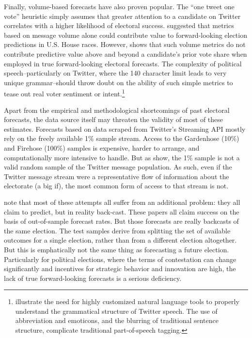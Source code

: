 \documentclass{article}
\begin{document}
Finally, volume-based forecasts have also proven popular. The ``one
tweet one vote'' heuristic simply assumes that greater attention to a
candidate on Twitter correlates with a higher likelihood of electoral
success. \cite{digrazia2013} suggested that metrics based on message
volume alone could contribute value to forward-looking election
predictions in U.S. House races. However, \cite{huberty2013twitter}
shows that such volume metrics do not contribute predictive value above
and beyond a candidate's prior vote share when employed in true
forward-looking electoral forecasts. The complexity of political
speech--particularly on Twitter, where the 140 character limit leads
to very unique grammar--should throw doubt on the ability of such
simple metrics to tease out real voter sentiment or
intent.\footnote{\cite{owoputi2013improved} illustrate the need for
  highly customized natural language tools to properly understand the
  grammatical structure of Twitter speech. The use of abbreviation and
  emoticons, and the blurring of traditional sentence structure,
  complicate traditional part-of-speech tagging.}

Apart from the empirical and methodological shortcomings of past
electoral forecasts, the data source itself may threaten the validity
of most of these estimates. Forecasts based on data scraped from
Twitter's Streaming API mostly rely on the freely available 1\% sample
stream. Access to the Gardenhose (10\%) and Firehose (100\%) samples
is expensive, harder to arrange, and computationally more intensive to
handle. But as \cite{morstatter2013sample} show, the 1\% sample is not
a valid random sample of the Twitter message population. As such, even
if the Twitter message stream were a representative flow of
information about the electorate (a big if), the most common form of
access to that stream is not.

\cite{metaxas2011not} note that most of these attempts all suffer from
an additional problem: they all claim to predict, but in reality
back-cast. These papers all claim success on the basis of
out-of-sample forecast rates. But those forecasts are really backcasts
of the same election. The test samples derive from splitting the set
of available outcomes for a single election, rather than from a
different election altogether. But this is emphatically not the same
thing as forecasting a future election. Particularly for political
elections, where the terms of contestation can change significantly
and incentives for strategic behavior and innovation are high, the
lack of true forward-looking forecasts is a serious deficiency.
\end{document}
